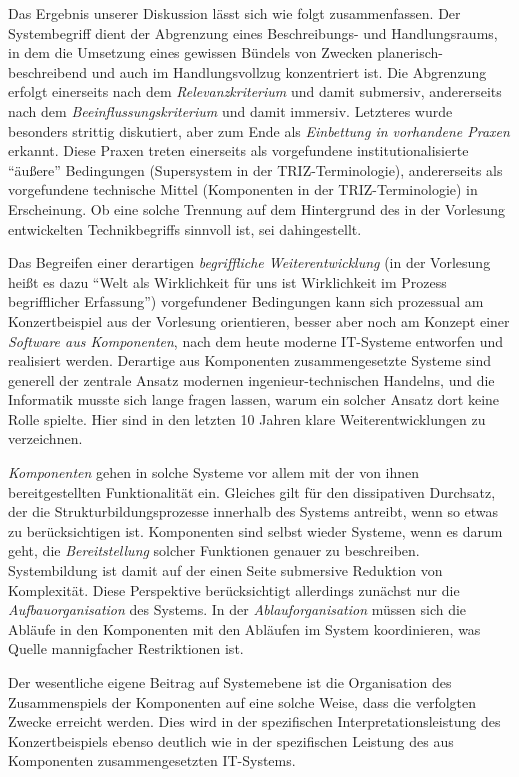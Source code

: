 \documentclass[11pt,a4paper]{article}
\begin{document}
Das Ergebnis unserer Diskussion lässt sich wie folgt zusammenfassen. Der
Systembegriff dient der Abgrenzung eines Beschreibungs- und
Handlungsraums, in dem die Umsetzung eines gewissen Bündels von Zwecken
planerisch-beschreibend und auch im Handlungsvollzug konzentriert ist.
Die Abgrenzung erfolgt einerseits nach dem \emph{Relevanzkriterium} und
damit submersiv, andererseits nach dem \emph{Beeinflussungskriterium}
und damit immersiv. Letzteres wurde besonders strittig diskutiert, aber
zum Ende als \emph{Einbettung in vorhandene Praxen} erkannt. Diese
Praxen treten einerseits als vorgefundene institutionalisierte
``äußere'' Bedingungen (Supersystem in der TRIZ-Terminologie),
andererseits als vorgefundene technische Mittel (Komponenten in der
TRIZ-Terminologie) in Erscheinung. Ob eine solche Trennung auf dem
Hintergrund des in der Vorlesung entwickelten Technikbegriffs sinnvoll
ist, sei dahingestellt.

Das Begreifen einer derartigen \emph{begriffliche Weiterentwicklung} (in
der Vorlesung heißt es dazu ``Welt als Wirklichkeit für uns ist
Wirklichkeit im Prozess begrifflicher Erfassung'') vorgefundener
Bedingungen kann sich prozessual am Konzertbeispiel aus der Vorlesung
orientieren, besser aber noch am Konzept einer \emph{Software aus
Komponenten}, nach dem heute moderne IT-Systeme entworfen und realisiert
werden. Derartige aus Komponenten zusammengesetzte Systeme sind generell
der zentrale Ansatz modernen ingenieur-technischen Handelns, und die
Informatik musste sich lange fragen lassen, warum ein solcher Ansatz
dort keine Rolle spielte. Hier sind in den letzten 10 Jahren klare
Weiterentwicklungen zu verzeichnen.

\emph{Komponenten} gehen in solche Systeme vor allem mit der von ihnen
bereitgestellten Funktionalität ein. Gleiches gilt für den dissipativen
Durchsatz, der die Strukturbildungsprozesse innerhalb des Systems
antreibt, wenn so etwas zu berücksichtigen ist. Komponenten sind selbst
wieder Systeme, wenn es darum geht, die \emph{Bereitstellung} solcher
Funktionen genauer zu beschreiben. Systembildung ist damit auf der einen
Seite submersive Reduktion von Komplexität. Diese Perspektive
berücksichtigt allerdings zunächst nur die \emph{Aufbauorganisation} des
Systems. In der \emph{Ablauforganisation} müssen sich die Abläufe in den
Komponenten mit den Abläufen im System koordinieren, was Quelle
mannigfacher Restriktionen ist.

Der wesentliche eigene Beitrag auf Systemebene ist die Organisation des
Zusammenspiels der Komponenten auf eine solche Weise, dass die
verfolgten Zwecke erreicht werden. Dies wird in der spezifischen
Interpretationsleistung des Konzertbeispiels ebenso deutlich wie in der
spezifischen Leistung des aus Komponenten zusammengesetzten IT-Systems.
\end{document}
